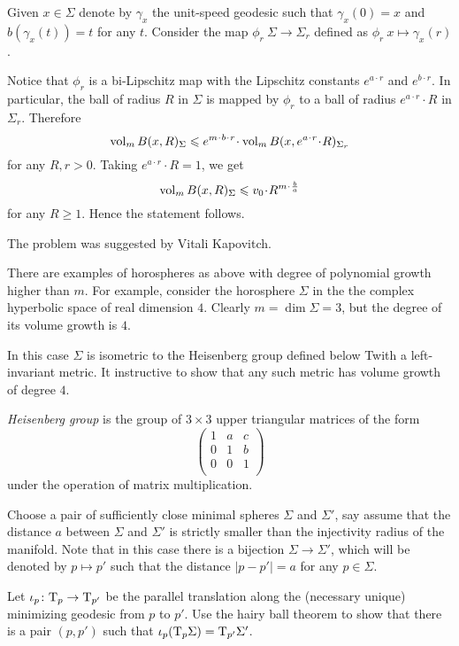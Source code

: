 Given $x\in \Sigma$ denote by $\gamma_x$ 
the unit-speed geodesic
such that $\gamma_x(0)=x$ and $b(\gamma_x(t))=t$ for any $t$.
Consider the map $\phi_{r}\:\Sigma\to\Sigma_r$ defined as
$\phi_r\:x\mapsto \gamma_x(r)$.

Notice that $\phi_r$ is a bi-Lipschitz map with the Lipschitz constants $e^{a\cdot r}$ and $e^{b\cdot r}$.
In particular, the ball of radius $R$ in $\Sigma$ is mapped by $\phi_r$
to a ball of radius $e^{a\cdot r}\cdot R$ in $\Sigma_r$.
Therefore
\[\vol_m B(x,R)_\Sigma\le e^{m\cdot b\cdot r}\cdot \vol_m B(x,e^{a\cdot r}\cdot R)_{\Sigma_r}\]
for any $R,r>0$.
Taking $e^{a\cdot r}\cdot R=1$, we get
\[\vol_m B(x,R)_\Sigma\le v_0\cdot R^{m\cdot \frac ba}\]
for any $R\ge1$. 
Hence the statement follows.
\qedsf

The problem was suggested by Vitali Kapovitch.

There are examples of horospheres as above with degree of polynomial growth higher than $m$.
For example, consider the horosphere $\Sigma$ in the
the complex hyperbolic space 
of real dimension $4$.
Clearly $m=\dim \Sigma=3$, but the degree of its volume growth is $4$.

In this case $\Sigma$ is isometric to the Heisenberg group defined below Twith a left-invariant metric.
It instructive to show that any such metric has volume  growth of degree $4$.

\emph{Heisenberg group}
is the group of $3\times3$ upper triangular matrices of the form
\[\begin{pmatrix}
 1 & a & c\\
 0 & 1 & b\\
 0 & 0 & 1\\
\end{pmatrix}\]
under the operation of matrix multiplication. 
                                                      



Choose a pair of sufficiently close minimal spheres $\Sigma$ and $\Sigma'$,
say assume that the distance $a$ between $\Sigma$ and $\Sigma'$ is strictly smaller than the injectivity radius of the manifold.
Note that in this case there is a bijection $\Sigma\to \Sigma'$, which will be denoted by $p\mapsto p'$ such that the distance $|p-p'|=a$ for any $p\in\Sigma$.

Let $\iota_p\colon\mathrm{T}_p\to\mathrm{T}_{p'}$ be the parallel translation along the (necessary unique) minimizing geodesic from $p$ to $p'$.
Use the hairy ball theorem 
to show that there is a pair $(p,p')$ such that $\iota_p(\mathrm{T}_p\Sigma)=\mathrm{T}_{p'}\Sigma'$.

